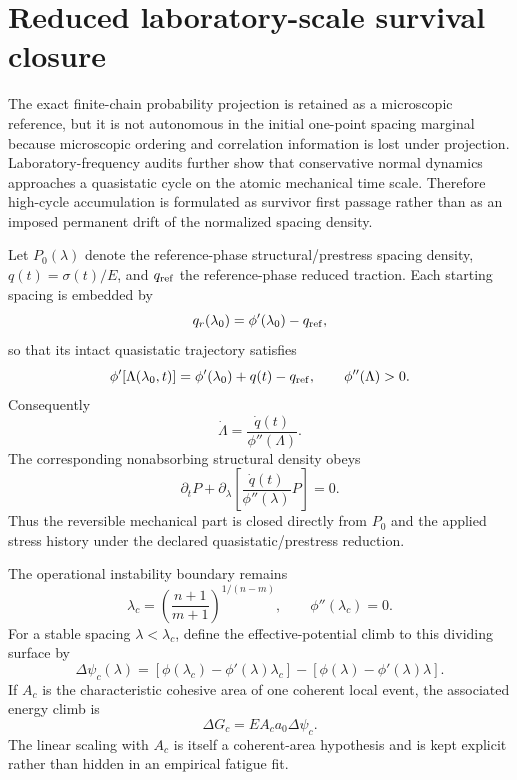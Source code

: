 
\section{Reduced laboratory-scale survival closure}
\label{sec:reduced_survival_closure}

The exact finite-chain probability projection is retained as a microscopic reference, but it is not autonomous in the initial one-point spacing marginal because microscopic ordering and correlation information is lost under projection. Laboratory-frequency audits further show that conservative normal dynamics approaches a quasistatic cycle on the atomic mechanical time scale. Therefore high-cycle accumulation is formulated as survivor first passage rather than as an imposed permanent drift of the normalized spacing density.

Let $P_0(\lambda)$ denote the reference-phase structural/prestress spacing density, $q(t)=\sigma(t)/E$, and $q_{\rm ref}$ the reference-phase reduced traction. Each starting spacing is embedded by
\begin{equation}
q_r(\lambda_0)=\phi'(\lambda_0)-q_{\rm ref},
\end{equation}
so that its intact quasistatic trajectory satisfies
\begin{equation}
\phi'[\Lambda(\lambda_0,t)]
=\phi'(\lambda_0)+q(t)-q_{\rm ref},
\qquad
\phi''(\Lambda)>0.
\end{equation}
Consequently
\begin{equation}
\dot\Lambda=\frac{\dot q(t)}{\phi''(\Lambda)}.
\end{equation}
The corresponding nonabsorbing structural density obeys
\begin{equation}
\partial_tP+\partial_\lambda\left[
\frac{\dot q(t)}{\phi''(\lambda)}P
\right]=0.
\end{equation}
Thus the reversible mechanical part is closed directly from $P_0$ and the applied stress history under the declared quasistatic/prestress reduction.

The operational instability boundary remains
\begin{equation}
\lambda_c=\left(\frac{n+1}{m+1}\right)^{1/(n-m)},
\qquad \phi''(\lambda_c)=0.
\end{equation}
For a stable spacing $\lambda<\lambda_c$, define the effective-potential climb to this dividing surface by
\begin{equation}
\Delta\psi_c(\lambda)
=\left[\phi(\lambda_c)-\phi'(\lambda)\lambda_c\right]
-\left[\phi(\lambda)-\phi'(\lambda)\lambda\right].
\end{equation}
If $A_c$ is the characteristic cohesive area of one coherent local event, the associated energy climb is
\begin{equation}
\Delta G_c=EA_ca_0\Delta\psi_c.
\end{equation}
The linear scaling with $A_c$ is itself a coherent-area hypothesis and is kept explicit rather than hidden in an empirical fatigue fit.

